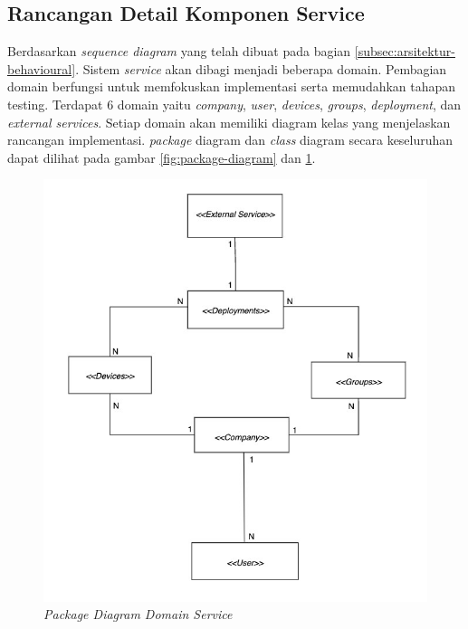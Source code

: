 \subsection{Rancangan Detail Komponen Service}
\label{sec:rancangan-service}

Berdasarkan \textit{sequence diagram} yang telah dibuat pada bagian \ref{subsec:arsitektur-behavioural}. Sistem \textit{service} akan dibagi menjadi beberapa domain. Pembagian domain berfungsi untuk memfokuskan implementasi serta memudahkan tahapan testing. Terdapat 6 domain yaitu \textit{company}, \textit{user}, \textit{devices}, \textit{groups}, \textit{deployment}, dan \textit{external services}. Setiap domain akan memiliki diagram kelas yang menjelaskan rancangan implementasi. \textit{package} diagram dan \textit{class} diagram secara keseluruhan dapat dilihat pada gambar \ref{fig:package-diagram} dan \ref{fig:package-class-domain-diagram}.
\begin{figure}[ht]
  \centering
  \includegraphics[width=1\textwidth]{resources/chapter-3/class/class-diagram-overall.jpg}
  \caption{\textit{Package Diagram Domain Service}}
  \label{fig:package-class-domain-diagram}
\end{figure}


